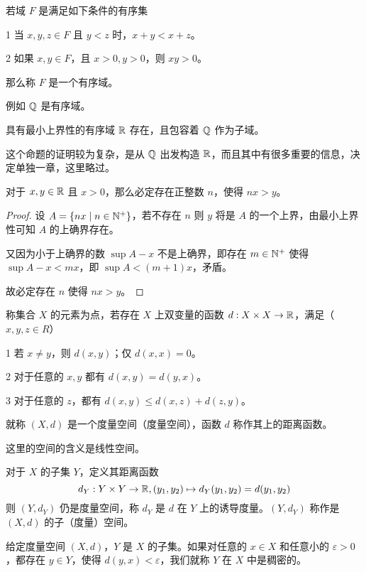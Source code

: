 \begin{definition}[有序域]
	若域 $F$ 是满足如下条件的有序集

	\num{1} 当 $x,y,z\in F$ 且 $y<z$ 时，$x+y<x+z$。

	\num{2} 如果 $x,y\in F$，且 $x>0,y>0$，则 $xy>0$。

	那么称 $F$ 是一个有序域。
\end{definition}

例如 $\mathbb{Q}$ 是有序域。

\begin{theorem}[存在定理]
	具有最小上界性的有序域 $\mathbb{R}$ 存在，且包容着 $\mathbb{Q}$ 作为子域。
\end{theorem}

这个命题的证明较为复杂，是从 $\mathbb{Q}$ 出发构造 $\mathbb{R}$，而且其中有很多重要的信息，决定单独一章，这里略过。

\begin{theorem}[Achimedes 原理]
	对于 $x,y \in \mathbb{R}$ 且 $x>0$，那么必定存在正整数 $n$，使得 $nx>y$。
\end{theorem}
\begin{proof}
	设 $A = \{nx \mid n \in \mathbb{N}^+ \}$，若不存在 $n$ 则 $y$ 将是 $A$ 的一个上界，由最小上界性可知 $A$ 的上确界存在。
	
	又因为小于上确界的数 $\sup A-x$ 不是上确界，即存在 $m\in \mathbb{N}^+$ 使得 $\sup A -x <mx$，即 $\sup A < (m+1)x$，矛盾。

	故必定存在 $n$ 使得 $nx>y$。
\end{proof}

\begin{definition}[度量空间]
	称集合 $X$ 的元素为点，若存在 $X$ 上双变量的函数 $d:X \times X \to \mathbb{R}$，满足（$x,y,z\in R$）

	\num{1} 若 $x\ne y$，则 $d(x,y)$；仅 $d(x,x)=0$。

	\num{2} 对于任意的 $x,y$ 都有 $d(x,y) = d(y,x)$。

	\num{3} 对于任意的 $z$，都有 $d(x,y) \leqslant d(x,z) + d(z,y)$。

	就称 $(X,d)$ 是一个度量空间（度量空间），函数 $d$ 称作其上的距离函数。
\end{definition}

这里的空间的含义是线性空间。

对于 $X$ 的子集 $Y$，定义其距离函数
$$d_Y: Y \times Y \to \mathbb{R}, (y_1,y_2) \mapsto d_Y(y_1,y_2)=d(y_1,y_2)$$
则 $(Y,d_Y)$ 仍是度量空间，称 $d_Y$ 是 $d$ 在 $Y$ 上的诱导度量。$(Y,d_Y)$ 称作是 $(X,d)$ 的子（度量）空间。

\begin{definition}[稠密性]
	给定度量空间 $(X,d)$，$Y$ 是 $X$ 的子集。如果对任意的 $x\in X$ 和任意小的 $\varepsilon>0$，都存在 $y\in Y$，使得 $d(y,x)<\varepsilon$，我们就称 $Y$ 在 $X$ 中是稠密的。
\end{definition}

